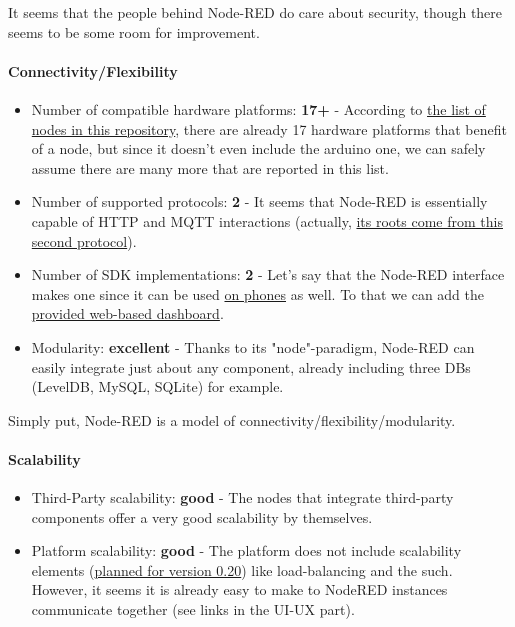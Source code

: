 \documentclass{article}
\begin{document}
It seems that the people behind Node-RED do care about security, though there seems to be some room for improvement.

\paragraph{Connectivity/Flexibility}

\begin{itemize}
\item Number of compatible hardware platforms: \textbf{17+} - According to \href{https://github.com/node-red/node-red-nodes}{the list of nodes in this repository}, there are already 17 hardware platforms that benefit of a node, but since it doesn't even include the arduino one, we can safely assume there are many more that are reported in this list.
\item Number of supported protocols: \textbf{2} - It seems that Node-RED is essentially capable of HTTP and MQTT interactions (actually, \href{https://nodered.org/about/}{its roots come from this second protocol}).
\item Number of SDK implementations: \textbf{2} - Let's say that the Node-RED interface makes one since it can be used \href{https://nodered.org/docs/platforms/android}{on phones} as well. To that we can add the \href{https://github.com/node-red/node-red-dashboard}{provided web-based dashboard}.
\item Modularity: \textbf{excellent} - Thanks to its "node"-paradigm, Node-RED can easily integrate just about any component, already including three DBs (LevelDB, MySQL, SQLite) for example.
\end{itemize}

Simply put, Node-RED is a model of connectivity/flexibility/modularity.

\paragraph{Scalability}

\begin{itemize}
\item Third-Party scalability: \textbf{good} - The nodes that integrate third-party components offer a very good scalability by themselves.
\item Platform scalability: \textbf{good} - The platform does not include scalability elements (\href{https://nodered.org/blog/2017/07/17/roadmap-to-1-dot-0}{planned for version 0.20}) like load-balancing and the such. However, it seems it is already easy to make to NodeRED instances communicate together (see links in the UI-UX part).
\end{itemize}
\end{document}
